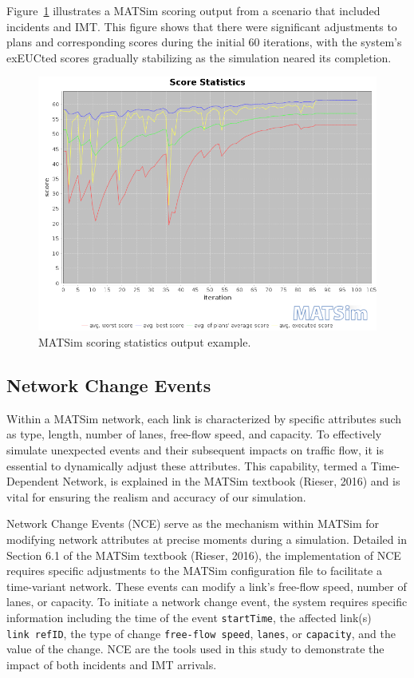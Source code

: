 \documentclass[fancy, oneside, mastersfancy, ms]{byuthesis}
\begin{document}
Figure~\ref{fig-score_output} illustrates a MATSim scoring output from a
scenario that included incidents and IMT. This figure shows that there
were significant adjustments to plans and corresponding scores during
the initial 60 iterations, with the system's exEUCted scores gradually
stabilizing as the simulation neared its completion.

\begin{figure}

{\centering \includegraphics{figures/scorestats.png}

}

\caption{\label{fig-score_output}MATSim scoring statistics output
example.}

\end{figure}

\hypertarget{sec-NCE}{%
\subsection{Network Change Events}\label{sec-NCE}}

Within a MATSim network, each link is characterized by specific
attributes such as type, length, number of lanes, free-flow speed, and
capacity. To effectively simulate unexpected events and their subsequent
impacts on traffic flow, it is essential to dynamically adjust these
attributes. This capability, termed a Time-Dependent Network, is
explained in the MATSim textbook (Rieser, 2016) and is vital for
ensuring the realism and accuracy of our simulation.

Network Change Events (NCE) serve as the mechanism within MATSim for
modifying network attributes at precise moments during a simulation.
Detailed in Section 6.1 of the MATSim textbook (Rieser, 2016), the
implementation of NCE requires specific adjustments to the MATSim
configuration file to facilitate a time-variant network. These events
can modify a link's free-flow speed, number of lanes, or capacity. To
initiate a network change event, the system requires specific
information including the time of the event \texttt{startTime}, the
affected link(s) \texttt{link\ refID}, the type of change
\texttt{free-flow\ speed}, \texttt{lanes}, or \texttt{capacity}, and the
value of the change. NCE are the tools used in this study to demonstrate
the impact of both incidents and IMT arrivals.
\end{document}
